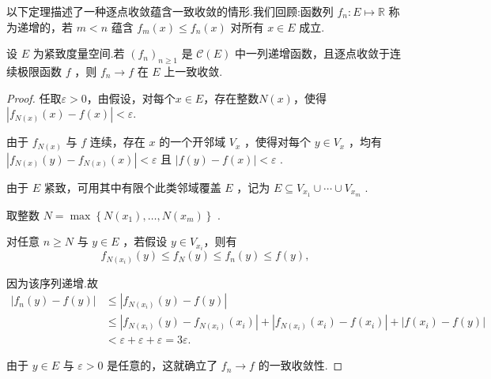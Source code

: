 以下定理描述了一种逐点收敛蕴含一致收敛的情形.我们回顾:函数列 ${f}_{n} : E \mapsto  \mathbb{R}$ 称为递增的，若 $m < n$ 蕴含 ${f}_{m}\left( x\right)  \leq  {f}_{n}\left( x\right)$ 对所有 $x \in  E$ 成立.

\begin{theorem}[Dini]\label{thm:dini}
设 $E$ 为紧致度量空间.若 ${\left( {f}_{n}\right) }_{n \geq  1}$ 是 $\mathcal{C}\left( E\right)$ 中一列递增函数，且逐点收敛于连续极限函数 $f$ ，则 ${f}_{n} \rightarrow  f$ 在 $E$ 上一致收敛.
\end{theorem}

\begin{proof}
任取$\varepsilon  > 0$，由假设，对每个$x \in  E$，存在整数$N\left( x\right)$，使得$\left| {{f}_{N\left( x\right) }\left( x\right)- f\left( x\right) }\right|  < \varepsilon$.

由于 ${f}_{N\left( x\right) }$ 与 $f$ 连续，存在 $x$ 的一个开邻域 ${V}_{x}$ ，使得对每个 $y \in  {V}_{x}$ ，均有 $\left| {{f}_{N\left( x\right) }\left( y\right)  - {f}_{N\left( x\right) }\left( x\right) }\right|  < \varepsilon$ 且 $\left| {f\left( y\right)  - f\left( x\right) }\right|  < \varepsilon$ .

由于 $E$ 紧致，可用其中有限个此类邻域覆盖 $E$ ，记为 $E \subseteq  {V}_{{x}_{1}} \cup  \cdots  \cup  {V}_{{x}_{m}}$ .

取整数 $N = \max \left\{  {N\left( {x}_{1}\right) ,\ldots ,N\left( {x}_{m}\right) }\right\}$ .\par
对任意 $n \geq  N$ 与 $y \in  E$ ，若假设 $y \in  {V}_{{x}_{i}}$，则有
\[
{f}_{N\left( {x}_{i}\right) }\left( y\right)  \leq  {f}_{N}\left( y\right)  \leq  {f}_{n}\left( y\right)  \leq  f\left( y\right) ,
\]

因为该序列递增.故
{\setjot[-2]\begin{align*}
\left| {{f}_{n}\left( y\right)  - f\left( y\right) }\right|  &\leq  \left| {{f}_{N\left( {x}_{i}\right) }\left( y\right)  - f\left( y\right) }\right| \\
&\leq  \left| {{f}_{N\left( {x}_{i}\right) }\left( y\right)  - {f}_{N\left( {x}_{i}\right) }\left( {x}_{i}\right) }\right|  + \left| {{f}_{N\left( {x}_{i}\right) }\left( {x}_{i}\right)  - f\left( {x}_{i}\right) }\right|  + \left| {f\left( {x}_{i}\right)  - f\left( y\right) }\right| \\
&< \varepsilon  + \varepsilon  + \varepsilon=3\varepsilon.
\end{align*}}


由于 $y \in  E$ 与 $\varepsilon  > 0$ 是任意的，这就确立了 ${f}_{n} \rightarrow  f$ 的一致收敛性.
\end{proof}

